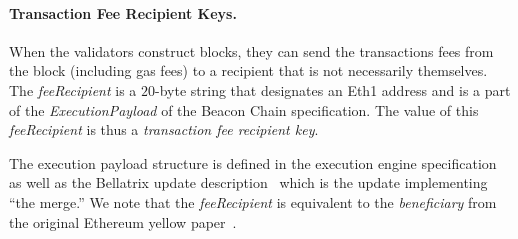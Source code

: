 \paragraph{Transaction Fee Recipient Keys.}    When the validators construct blocks, they can send the transactions fees from the block (including gas fees) to a recipient that is not necessarily themselves.  The \emph{feeRecipient} is a $20$-byte string that designates an Eth1 address and is a part of the \emph{ExecutionPayload} of the Beacon Chain specification.  The value of this \emph{feeRecipient} is thus a \emph{transaction fee recipient key}.  

The execution payload structure is defined in the execution engine specification~\cite{EthEng} as well as the Bellatrix update description~\cite{EthBella} which is the update implementing ``the merge.''  We note that the \emph{feeRecipient} is equivalent to the \emph{beneficiary} from the original Ethereum yellow paper~\cite{wood2014ethereum}.